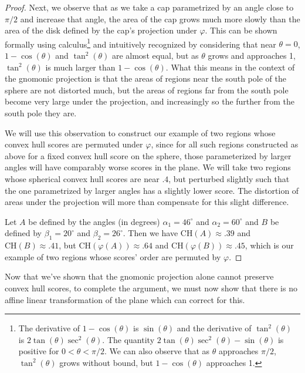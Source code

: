 \begin{proof}
Next, we observe that as we take a cap parametrized by an angle close to $\pi/2$ and increase that angle, the area of the cap grows much more slowly than the area of the disk defined by the cap's projection under $\varphi$.  This can be shown formally using calculus\footnote{The derivative of $1-\cos(\theta)$ is $\sin(\theta)$ and the derivative of $\tan^2(\theta)$ is $2\tan(\theta)\sec^2(\theta)$.  The quantity $2\tan(\theta)\sec^2(\theta)-\sin(\theta)$ is positive for $0<\theta<\pi/2$.  We can also observe that as $\theta$ approaches $\pi/2$, $\tan^2(\theta)$ grows without bound, but $1-\cos(\theta)$ approaches 1.} and intuitively recognized by considering that near $\theta=0$, $1-\cos(\theta)$ and $\tan^2(\theta)$ are almost equal, but as $\theta$ grows and approaches 1, $\tan^2(\theta)$ is much larger than $1-\cos(\theta)$.  What this means in the context of the gnomonic projection is that the areas of regions near the south pole of the sphere are not distorted much, but the areas of regions far from the south pole become very large under the projection, and increasingly so the further from the south pole they are. 

We will use this observation to construct our example of two regions whose convex hull scores are permuted under $\varphi$, since for all such regions constructed as above for a fixed convex hull score on the sphere, those parameterized by larger angles will have comparably worse scores in the plane.  We will take two regions whose spherical convex hull scores are near $.4$, but perturbed slightly such that the one parametrized by larger angles has a slightly lower score.  The distortion of areas under the projection will more than compensate for this slight difference.

Let $A$ be defined by the angles (in degrees) $\alpha_1=46^\circ$ and $\alpha_2=60^\circ$ and $B$ be defined by $\beta_1=20^\circ$ and $\beta_2=26^\circ$.  Then we have $\mathrm{CH}(A)\approx .39$ and $\mathrm{CH}(B)\approx .41$, but $\mathrm{CH}(\varphi(A))\approx .64$ and $\mathrm{CH}(\varphi(B))\approx .45$, which is our example of two regions whose scores' order are permuted by $\varphi$.





\end{proof}



Now that we've shown that the gnomonic projection alone cannot preserve convex hull scores, to complete the argument, we must now show that there is no affine linear transformation of the plane which can correct for this.

